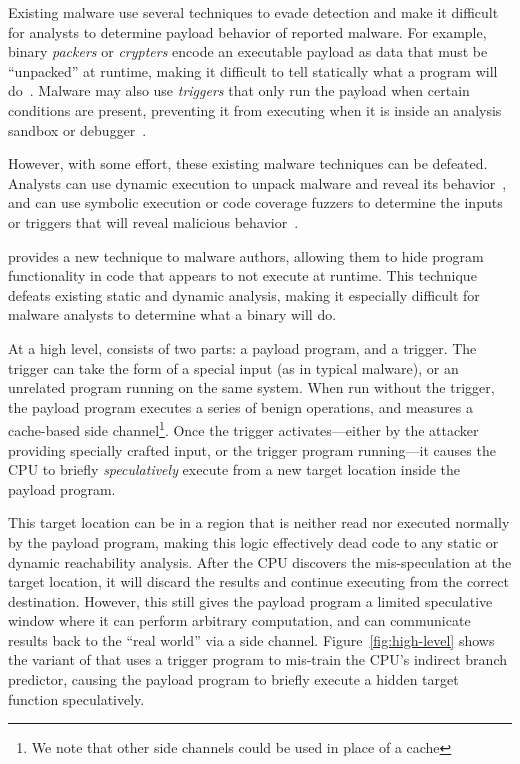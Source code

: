 Existing malware use several techniques to evade detection and
make it difficult for analysts to determine payload behavior of reported malware. 
For example, binary \emph{packers} or \emph{crypters} encode an executable payload as
data that must be ``unpacked'' at runtime, making it difficult to tell
statically what a program will do~\cite{malware-packers}. Malware may also use
\emph{triggers} that only run the payload when certain conditions are present, preventing
it from executing when it is inside an analysis sandbox or 
debugger~\cite{balzarotti2010efficient,red-pill}.

However, with some effort, these existing malware techniques can be defeated.
Analysts can use
dynamic execution to unpack malware and reveal its
behavior~\cite{balzarotti2010efficient}, and can use symbolic execution or code
coverage fuzzers to determine the inputs or triggers that will reveal malicious
behavior~\cite{moser2007exploring,schwartz2010all,wang2017angr,egele2012survey}.


\speculake provides a new technique to malware authors, allowing them to hide
program functionality in code that appears to not execute at runtime. This technique
defeats existing static and dynamic analysis, making it especially difficult for
malware analysts to determine what a binary will do.

\FigHighLevel

At a high level, \speculake consists of two parts: a payload program, and a
trigger. The trigger can take the form of a special input (as in typical
malware), or an unrelated program running on the same system. When run without
the trigger, the payload program executes a series of benign operations, and
measures a cache-based side channel\footnote{We note that other side channels
could be used in place of a cache}. Once the trigger activates---either
by the attacker providing specially crafted input, or the trigger program running---it causes
the CPU to briefly \emph{speculatively} execute from a new target location inside the
payload program.

This target location can be in a region that is neither read
nor executed normally by the payload program, making this logic effectively dead code to
any static or dynamic reachability analysis. After the CPU discovers the
mis-speculation at the target location, it will discard the results and continue
executing from the correct destination. However, this still gives the payload program a
limited speculative window where it can perform arbitrary computation, and can
communicate results back to the ``real world'' via a side
channel. Figure~\ref{fig:high-level} shows the variant of \speculake that uses a
trigger program to mis-train the CPU's indirect branch predictor, causing the
payload program to briefly execute a hidden target function speculatively.


